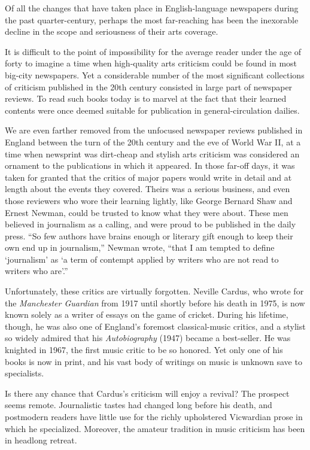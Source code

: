 \documentclass[UTF8,11pt]{ctexart}
\begin{document}
Of all the changes that have taken place in English-language newspapers during the past quarter-century, perhaps the most far-reaching has been the inexorable decline in the scope and seriousness of their arts coverage.


It is difficult to the point of impossibility for the average reader under the age of forty to imagine a time when high-quality arts criticism could be found in most big-city newspapers. Yet a considerable number of the most significant collections of criticism published in the 20th century consisted in large part of newspaper reviews. To read such books today is to marvel at the fact that their learned contents were once deemed suitable for publication in general-circulation dailies.


We are even farther removed from the unfocused newspaper reviews published in England between the turn of the 20th century and the eve of World War II, at a time when newsprint was dirt-cheap and stylish arts criticism was considered an ornament to the publications in which it appeared. In those far-off days, it was taken for granted that the critics of major papers would write in detail and at length about the events they covered. Theirs was a serious business, and even those reviewers who wore their learning lightly, like George Bernard Shaw and Ernest Newman, could be trusted to know what they were about. These men believed in journalism as a calling, and were proud to be published in the daily press. “So few authors have brains enough or literary gift enough to keep their own end up in journalism,” Newman wrote, “that I am tempted to define ‘journalism’ as ‘a term of contempt applied by writers who are not read to writers who are’.”


Unfortunately, these critics are virtually forgotten. Neville Cardus, who wrote for the \textit{Manchester Guardian} from 1917 until shortly before his death in 1975, is now known solely as a writer of essays on the game of cricket. During his lifetime, though, he was also one of England’s foremost classical-music critics, and a stylist so widely admired that his \textit{Autobiography} (1947) became a best-seller. He was knighted in 1967, the first music critic to be so honored. Yet only one of his books is now in print, and his vast body of writings on music is unknown save to specialists.


Is there any chance that Cardus’s criticism will enjoy a revival? The prospect seems remote. Journalistic tastes had changed long before his death, and postmodern readers have little use for the richly upholstered Vicwardian prose in which he specialized. Moreover, the amateur tradition in music criticism has been in headlong retreat.
\end{document}
